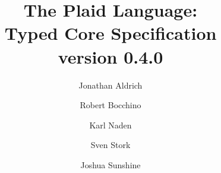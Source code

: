 \documentclass[12pt]{article}
\title{The Plaid Language:\\
Typed Core Specification\\
\vspace{2ex}
version 0.4.0\\
\vspace{2ex}
}
\author{Jonathan Aldrich \and Robert Bocchino \and Karl Naden \and Sven Stork \and Joshua Sunshine}
\date{\monthname~\the \year}
\begin{document}
\renewcommand*{\thepage}{title-\arabic{page}} 
\maketitle
\renewcommand*{\thepage}{\arabic{page}} 

















\end{document}
